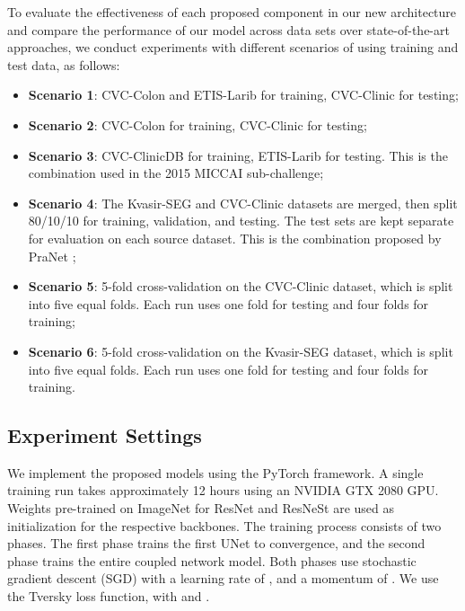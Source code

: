 \documentclass[review, sort&compress]{elsarticle}
\begin{document}
	To evaluate the effectiveness of each proposed component in our new architecture and compare the performance of our model across data sets over state-of-the-art approaches, we conduct experiments with different scenarios of using training and test data, as follows:
	\begin{itemize}
		\item \textbf{Scenario 1}: CVC-Colon and ETIS-Larib for training, CVC-Clinic for testing;
		\item \textbf{Scenario 2}: CVC-Colon for training, CVC-Clinic for testing;
		\item \textbf{Scenario 3}: CVC-ClinicDB for training, ETIS-Larib for testing. This is the combination used in the 2015 MICCAI sub-challenge;
		\item \textbf{Scenario 4}: The Kvasir-SEG and CVC-Clinic datasets are merged, then split 80/10/10 for training, validation, and testing. The test sets are kept separate for evaluation on each source dataset. This is the combination proposed by PraNet \cite{fan2020pranet};
		\item \textbf{Scenario 5}: 5-fold cross-validation on the CVC-Clinic dataset, which is split into five equal folds. Each run uses one fold for testing and four folds for training;
		\item \textbf{Scenario 6}: 5-fold cross-validation on the Kvasir-SEG dataset, which is split into five equal folds. Each run uses one fold for testing and four folds for training.
	\end{itemize}
	
	\subsection{Experiment Settings}
	We implement the proposed models using the PyTorch framework. A single training run takes approximately 12 hours using an NVIDIA GTX 2080 GPU. Weights pre-trained on ImageNet for ResNet and ResNeSt are used as initialization for the respective backbones. The training process consists of two phases. The first phase trains the first UNet to convergence, and the second phase trains the entire coupled network model. Both phases use stochastic gradient descent (SGD) with a learning rate of , and a momentum of . We use the Tversky loss function, with  and .
	
\end{document}
